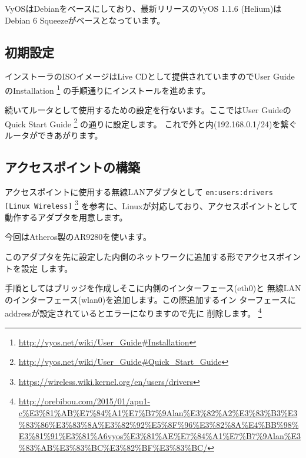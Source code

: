 \documentclass[mingoth,a4paper]{jsarticle}
\begin{document}
VyOSはDebianをベースにしており、最新リリースのVyOS 1.1.6 (Helium)は
Debian 6 Squeezeがベースとなっています。

\subsection{初期設定}

インストーラのISOイメージはLive CDとして提供されていますのでUser GuideのInstallation
\footnote{\url{http://vyos.net/wiki/User_Guide\#Installation}}
の手順通りにインストールを進めます。

続いてルータとして使用するための設定を行ないます。ここではUser GuideのQuick Start Guide
\footnote{\url{http://vyos.net/wiki/User_Guide\#Quick_Start_Guide}}
の通りに設定します。
これで外と内(192.168.0.1/24)を繋ぐルータができあがります。

\subsection{アクセスポイントの構築}

アクセスポイントに使用する無線LANアダプタとして
{\tt en:users:drivers [Linux Wireless]}
\footnote{\url{https://wireless.wiki.kernel.org/en/users/drivers}}
を参考に、Linuxが対応しており、アクセスポイントとして動作するアダプタを用意します。

今回はAtheros製のAR9280を使います。

このアダプタを先に設定した内側のネットワークに追加する形でアクセスポイントを設定
します。

手順としてはブリッジを作成しそこに内側のインターフェース(eth0)と
無線LANのインターフェース(wlan0)を追加します。この際追加するイン
ターフェースにaddressが設定されているとエラーになりますので先に
削除します。
\footnote{\url{http://orebibou.com/2015/01/apu1-c\%E3\%81\%AB\%E7\%84\%A1\%E7\%B7\%9Alan\%E3\%82\%A2\%E3\%83\%B3\%E3\%83\%86\%E3\%83\%8A\%E3\%82\%92\%E5\%8F\%96\%E3\%82\%8A\%E4\%BB\%98\%E3\%81\%91\%E3\%81\%A6vyos\%E3\%81\%AE\%E7\%84\%A1\%E7\%B7\%9Alan\%E3\%83\%AB\%E3\%83\%BC\%E3\%82\%BF\%E3\%83\%BC/}}

\end{document}
